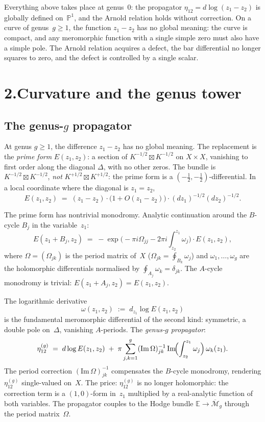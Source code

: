 \documentclass[11pt]{report}
\theoremstyle{definition}
\theoremstyle{remark}
\numberwithin{equation}{section}
\begin{document}
Everything above takes place at genus~$0$: the propagator
$\eta_{12}=d\log(z_1-z_2)$ is globally defined on~$\mathbb P^1$,
and the Arnold relation holds without correction. On a curve of
genus~$g \geq 1$, the function $z_1 - z_2$ has no global meaning:
the curve is compact, and any meromorphic function with a single
simple zero must also have a simple pole. The Arnold relation
acquires a defect, the bar differential no longer squares to zero,
and the defect is controlled by a single scalar.


\section*{2.\quad Curvature and the genus tower}

\subsection*{The genus-$g$ propagator}

At genus $g\ge 1$, the difference $z_1-z_2$ has no global meaning.
The replacement is the \emph{prime form} $E(z_1,z_2)$: a section
of $K^{-1/2}\boxtimes K^{-1/2}$ on $X\times X$, vanishing to
first order along the diagonal $\Delta$, with no other zeros. The
bundle is $K^{-1/2}\boxtimes K^{-1/2}$, \emph{not}
$K^{+1/2}\boxtimes K^{+1/2}$: the prime form is a
$(-\frac12,-\frac12)$-differential. In a local coordinate where
the diagonal is $z_1=z_2$,
\[
E(z_1,z_2)
\;=\;
(z_1-z_2)\cdot\bigl(1+O(z_1-z_2)\bigr)
\cdot(dz_1)^{-1/2}(dz_2)^{-1/2}.
\]

The prime form has nontrivial monodromy. Analytic continuation
around the $B$-cycle $B_j$ in the variable~$z_1$:
\[
E(z_1+B_j,z_2)
\;=\;
-\exp\bigl(
-\pi i\Omega_{jj}-2\pi i\textstyle\int_{z_2}^{z_1}\omega_j
\bigr)
\cdot E(z_1,z_2),
\]
where $\Omega=(\Omega_{jk})$ is the period matrix of~$X$
($\Omega_{jk}=\oint_{B_k}\omega_j$) and
$\omega_1,\dots,\omega_g$ are the holomorphic differentials
normalised by $\oint_{A_j}\omega_k=\delta_{jk}$. The
$A$-cycle monodromy is trivial: $E(z_1+A_j,z_2)=E(z_1,z_2)$.

The logarithmic derivative
\[
\omega(z_1,z_2)
\;:=\;
d_{z_1}\log E(z_1,z_2)
\]
is the fundamental meromorphic differential of the second kind:
symmetric, a double pole on~$\Delta$, vanishing $A$-periods. The
\emph{genus-$g$ propagator}:
\[
\eta^{(g)}_{12}
\;=\;
d\log E(z_1,z_2)
\;+\;
\pi\sum_{j,k=1}^{g}
(\mathrm{Im}\,\Omega)^{-1}_{jk}\,
\mathrm{Im}\!\Bigl(\int_{z_2}^{z_1}\omega_j\Bigr)\,
\omega_k(z_1).
\]
The period correction $(\mathrm{Im}\,\Omega)^{-1}_{jk}$
compensates the $B$-cycle monodromy, rendering $\eta^{(g)}_{12}$
single-valued on~$X$. The price: $\eta^{(g)}_{12}$ is no longer
holomorphic: the correction term is a $(1,0)$-form in~$z_1$
multiplied by a real-analytic function of both variables. The
propagator couples to the Hodge bundle
$\mathbb E\to\overline{\mathcal M}_g$ through the period
matrix~$\Omega$.
\end{document}

